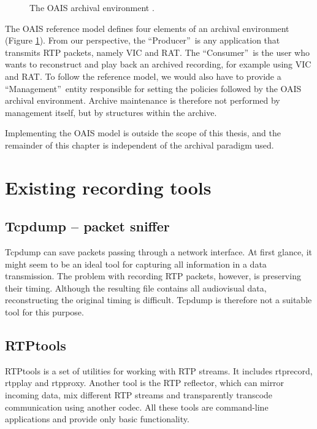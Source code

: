 \begin{figure}
\centering

\caption{The OAIS archival environment \cite{OAIS-RM}.}
\label{fig:OaisEnvironment}
\end{figure}

The OAIS reference model defines four elements of an archival environment (Figure \ref{fig:OaisEnvironment}). From our perspective, the \textquotedblleft Producer\textquotedblright\ is any application that transmits RTP packets, namely VIC and RAT. The \textquotedblleft Consumer\textquotedblright\ is the user who wants to reconstruct and play back an archived recording, for example using VIC and RAT. To follow the reference model, we would also have to provide a \textquotedblleft Management\textquotedblright\ entity responsible for setting the policies followed by the OAIS archival environment. Archive maintenance is therefore not performed by management itself, but by structures within the archive.

Implementing the OAIS model is outside the scope of this thesis, and the remainder of this chapter is independent of the archival paradigm used.

\section{Existing recording tools}

\subsection{Tcpdump -- packet sniffer}
Tcpdump can save packets passing through a network interface. At first glance, it might seem to be an ideal tool for capturing all information in a data transmission. The problem with recording RTP packets, however, is preserving their timing. Although the resulting file contains all audiovisual data, reconstructing the original timing is difficult. Tcpdump is therefore not a suitable tool for this purpose.

\subsection{RTPtools}
RTPtools is a set of utilities for working with RTP streams. It includes rtprecord, rtpplay and rtpproxy. Another tool is the RTP reflector, which can mirror incoming data, mix different RTP streams and transparently transcode communication using another codec.
All these tools are command-line applications and provide only basic functionality.


